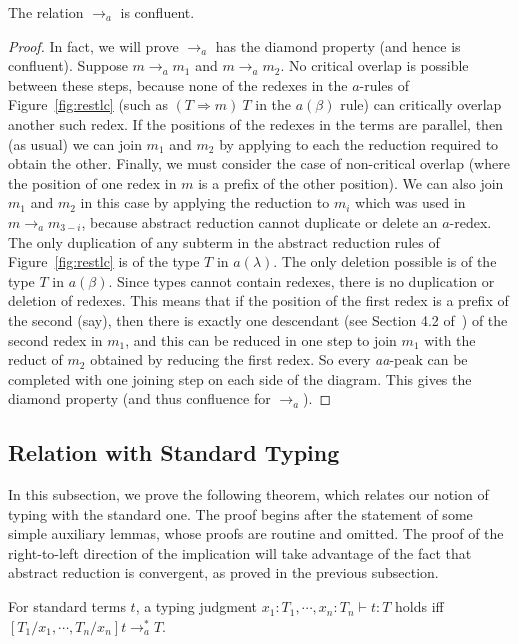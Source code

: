 \documentclass{LMCS}
\newcommand{\To}[0]{\Rightarrow}
\begin{document}
\begin{thm}
\label{lem:confl}
The relation $\to_a$ is confluent.
\end{thm}
\begin{proof}
In fact, we will prove $\to_a$ has the diamond property (and hence is
confluent).  Suppose $m \to_a m_1$ and $m\to_a m_2$.  No critical
overlap is possible between these steps, because none of the redexes
in the $a$-rules of Figure~\ref{fig:restlc} (such as $(T\To m)\ T$ in
the $a(\beta)$ rule) can critically overlap another such redex.  If
the positions of the redexes in the terms are parallel, then (as
usual) we can join $m_1$ and $m_2$ by applying to each the reduction
required to obtain the other.  Finally, we must consider the case of
non-critical overlap (where the position of one redex in $m$ is a
prefix of the other position).  We can also join $m_1$ and $m_2$ in
this case by applying the reduction to $m_i$ which was used in $m
\to_a m_{3-i}$, because abstract reduction cannot duplicate or delete
an $a$-redex.  The only duplication of any subterm in the abstract
reduction rules of Figure~\ref{fig:restlc} is of the type $T$ in
$\textit{a}(\lambda)$.  The only deletion possible is of the type $T$
in $\textit{a}(\beta)$.  Since types cannot contain redexes, there is
no duplication or deletion of redexes.  This means that if the
position of the first redex is a prefix of the second (say), then
there is exactly one descendant (see Section 4.2 of~\cite{terese}) of
the second redex in $m_1$, and this can be reduced in one step to join
$m_1$ with the reduct of $m_2$ obtained by reducing the first redex.
So every \textit{aa}-peak can be completed with one joining step on
each side of the diagram.  This gives the diamond property (and thus
confluence for $\to_a$).
\end{proof}

\subsection{Relation with Standard Typing}

In this subsection, we prove the following theorem, which relates our
notion of typing with the standard one.  The proof begins after the
statement of some simple auxiliary lemmas, whose proofs are routine
and omitted.  The proof of the right-to-left direction of the
implication will take advantage of the fact that abstract reduction is
convergent, as proved in the previous subsection.

\begin{thm}
\label{thm:relatetyp}
For standard terms $t$, a typing judgment $x_1:T_1,\cdots,x_n:T_n \vdash t:T$ holds iff $[T_1/x_1,\cdots,T_n/x_n]t \to_a^* T$.
\end{thm}
\end{document}
